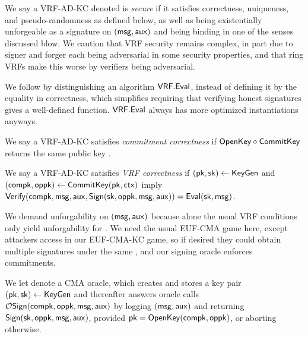 
We say a VRF-AD-KC denoted \VRF is {\em secure} if it satisfies
 correctness, uniqueness, and pseudo-randomness as defined below,
 as well as being existentially unforgeable as a signature on $(\mathsf{msg},\mathsf{aux})$
 and being binding in one of the senses discussed blow.
We caution that VRF security remains complex, in part due to
signer and forger each being adversarial in some security properties,
and that ring VRFs make this worse by verifiers being adversarial.

We follow \cite{agg_dkg} by distinguishing an algorithm ${\mathsf{VRF}}.{\mathsf{Eval}}$,
 instead of defining it by the equality in correctness,
which simplifies requiring that verifying honest signatures gives a well-defined function.
${\mathsf{VRF}}.{\mathsf{Eval}}$ always has more optimized instantiations anyways.


\begin{definition}
We say a VRF-AD-KC satisfies {\em commitment correctness} if
 ${\mathsf{OpenKey}} \circ {\ensuremath{\mathsf{CommitKey}}}$ returns the same public key \pk.
\end{definition}

\begin{definition}
We say a VRF-AD-KC satisfies {\em VRF correctness} if
$(\mathsf{pk},\mathsf{sk}) \leftarrow {\ensuremath{\mathsf{KeyGen}}}$ and $(\mathsf{compk},\mathsf{oppk}) \leftarrow {\ensuremath{\mathsf{CommitKey}}}(\mathsf{pk},\mathsf{ctx})$
imply
${\mathsf{Verify}}(\mathsf{compk},\mathsf{msg},\mathsf{aux},{\mathsf{Sign}}(\mathsf{sk},\mathsf{oppk},\mathsf{msg},\mathsf{aux})) = {\mathsf{Eval}}(\mathsf{sk},\mathsf{msg})$.
\end{definition}

We demand unforgability on $(\mathsf{msg},\mathsf{aux})$ because alone
 the usual VRF conditions only yield unforgability for \msg.
We need the usual EUF-CMA game here, except attackers access
\CommitKey in our EUF-CMA-KC game, so if desired
 they could obtain multiple signatures under the same \compk,
 and our signing oracle  enforces commitments.

\begin{definition}\label{def:vrf_sign_oracle}
We let  denote a CMA oracle, which creates and stores
a key pair $(\mathsf{pk},\mathsf{sk}) \leftarrow {\ensuremath{\mathsf{KeyGen}}}$ and thereafter
answers oracle calls $\mathcal{O}\mathsf{Sign}(\mathsf{compk},\mathsf{oppk},\mathsf{msg},\mathsf{aux})$ by 
logging $(\mathsf{msg},\mathsf{aux})$ and returning ${\mathsf{Sign}}(\mathsf{sk},\mathsf{oppk},\mathsf{msg},\mathsf{aux})$,
provided $\mathsf{pk} = {\mathsf{OpenKey}}(\mathsf{compk},\mathsf{oppk})$, or aborting otherwise.
\end{definition}

